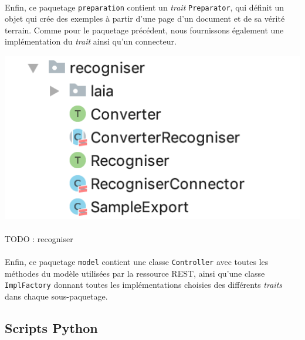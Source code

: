 \paragraph{}
Enfin, ce paquetage \texttt{preparation} contient un \textit{trait} \texttt{Preparator}, qui définit un objet qui crée des exemples à partir d'une page d'un document et de sa vérité terrain. Comme pour le paquetage précédent, nous fournissons également une implémentation du \textit{trait} ainsi qu'un connecteur.

\begin{mdframed}[frametitle={Figure 4 : Paquetage \texttt{recogniser}}, innerbottommargin=10]
\begin{center}
\includegraphics[scale=0.7]{assets/recogniser.png}
\end{center}
\end{mdframed}

\paragraph{}
TODO : recogniser

\paragraph{}
Enfin, ce paquetage \texttt{model} contient une classe \texttt{Controller} avec toutes les méthodes du modèle utilisées par la ressource REST, ainsi qu'une classe \texttt{ImplFactory} donnant toutes les implémentations choisies des différents \textit{traits} dans chaque sous-paquetage.

\subsection{Scripts Python}

